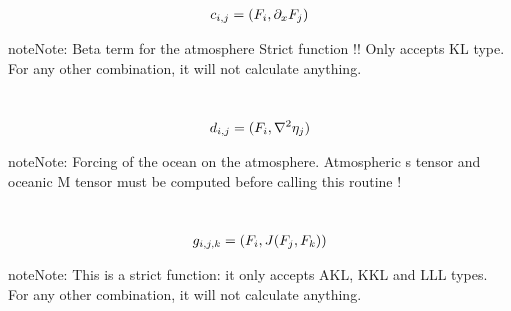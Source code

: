 \documentclass[letterpaper,10pt,english]{sphinxmanual}
\begin{document}
\begin{fulllineitems}
\begin{fulllineitems}
\end{fulllineitems}


\begin{fulllineitems}
\label{rstfiles/inprod_analytic:inprod_analytic.atm_tensors.calculate_c_atm}~\begin{gather}
\begin{split}c_{i,j} = (F_i, \partial_x F_j)\end{split}\notag
\end{gather}
\begin{notice}{note}{Note:}
Beta term for the atmosphere
Strict function !! Only accepts KL type.
For any other combination, it will not calculate anything.
\end{notice}

\end{fulllineitems}


\begin{fulllineitems}
\label{rstfiles/inprod_analytic:inprod_analytic.atm_tensors.calculate_d}~\begin{gather}
\begin{split}d_{i,j} = (F_i, \nabla^2 \eta_j)\end{split}\notag
\end{gather}
\begin{notice}{note}{Note:}
Forcing of the ocean on the atmosphere.
Atmospheric s tensor and oceanic M tensor must be computed
before calling this routine !
\end{notice}

\end{fulllineitems}


\begin{fulllineitems}
\label{rstfiles/inprod_analytic:inprod_analytic.atm_tensors.calculate_g}~\begin{gather}
\begin{split}g_{i,j,k} = (F_i, J(F_j, F_k))\end{split}\notag
\end{gather}
\begin{notice}{note}{Note:}
This is a strict function: it only accepts AKL, KKL
and LLL types.
For any other combination, it will not calculate anything.
\end{notice}


\end{fulllineitems}
\end{fulllineitems}
\end{document}
